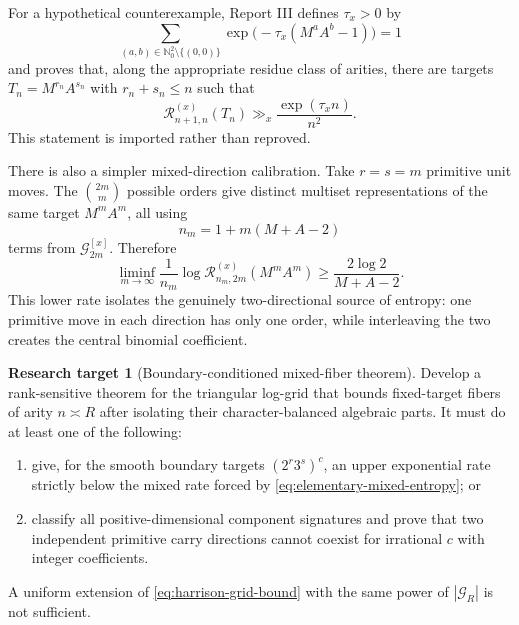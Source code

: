 \documentclass[11pt,oneside]{article}
\theoremstyle{definition}
\newtheorem{target}[theorem]{Research target}
\theoremstyle{remark}
\newcommand{\Nzero}{\mathbb N_0}
\newcommand{\cG}{\mathcal G}
\newcommand{\cR}{\mathcal R}
\begin{document}
For a hypothetical counterexample, Report III defines $\tau_x>0$ by
\begin{equation}
  \sum_{(a,b)\in\Nzero^2\setminus\{(0,0)\}}
  \exp\bigl(-\tau_x(M^aA^b-1)\bigr)=1
  \label{eq:imported-carry-pressure}
\end{equation}
and proves that, along the appropriate residue class of arities, there are targets
$T_n=M^{r_n}A^{s_n}$ with $r_n+s_n\le n$ such that
\begin{equation}
  \cR_{n+1,n}^{(x)}(T_n)
  \gg_x \frac{\exp(\tau_xn)}{n^2}.
  \label{eq:imported-boundary-fiber}
\end{equation}
This statement is imported rather than reproved.

There is also a simpler mixed-direction calibration.  Take $r=s=m$ primitive unit moves.  The
$\binom{2m}{m}$ possible orders give distinct multiset representations of the same target
$M^mA^m$, all using
\begin{equation}
  n_m=1+m(M+A-2)
  \label{eq:balanced-carry-arity}
\end{equation}
terms from $\cG_{2m}^{[x]}$.  Therefore
\begin{equation}
  \liminf_{m\to\infty}\frac1{n_m}
  \log\cR_{n_m,2m}^{(x)}(M^mA^m)
  \ge \frac{2\log2}{M+A-2}.
  \label{eq:elementary-mixed-entropy}
\end{equation}
This lower rate isolates the genuinely two-directional source of entropy: one primitive move in
each direction has only one order, while interleaving the two creates the central binomial
coefficient.

\begin{target}[Boundary-conditioned mixed-fiber theorem]
\label{target:boundary-fiber}
Develop a rank-sensitive theorem for the triangular log-grid that bounds fixed-target fibers of
arity $n\asymp R$ after isolating their character-balanced algebraic parts.  It must do at least
one of the following:
\begin{enumerate}
\item give, for the smooth boundary targets $(2^r3^s)^c$, an upper exponential rate strictly
below the mixed rate forced by \eqref{eq:elementary-mixed-entropy}; or
\item classify all positive-dimensional component signatures and prove that two independent
primitive carry directions cannot coexist for irrational $c$ with integer coefficients.
\end{enumerate}
A uniform extension of \eqref{eq:harrison-grid-bound} with the same power of $|\cG_R|$ is not
sufficient.
\end{target}
\end{document}
